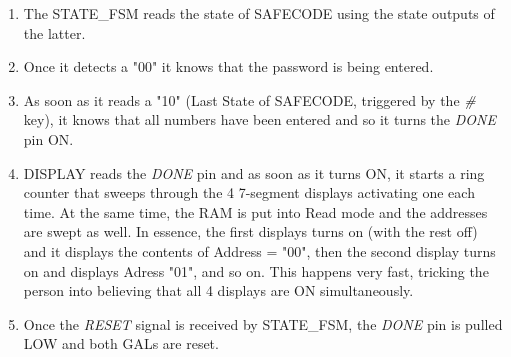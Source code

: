 \begin{enumerate}
    \item The STATE\_FSM reads the state of SAFECODE using the state outputs of the latter.
    
    \item Once it detects a "00" it knows that the password is being entered.
    
    \item As soon as it reads a "10" (Last State of SAFECODE, triggered by the \textit{\#} key), it knows that all numbers have been entered and so it turns the \textit{DONE} pin ON.
    
    \item DISPLAY reads the \textit{DONE} pin and as soon as it turns ON, it starts a ring counter that sweeps through the 4 7-segment displays activating one each time. At the same time, the RAM is put into Read mode and the addresses are swept as well. In essence, the first displays turns on (with the rest off) and it displays the contents of Address = "00", then the second display turns on and displays Adress "01", and so on. This happens very fast, tricking the person into believing that all 4 displays are ON simultaneously.
    
    \item Once the \textit{RESET} signal is received by STATE\_FSM, the \textit{DONE} pin is pulled LOW and both GALs are reset.
\end{enumerate}



